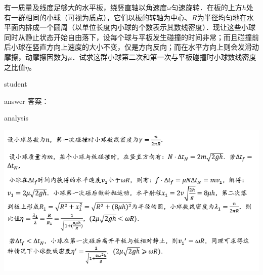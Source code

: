  
 \begin{example}
 	有一质量及线度足够大的水平板，绕竖直轴以角速度$ \omega $匀速旋转．在板的上方$ h $处有一群相同的小球（可视为质点），它们以板的转轴为中心、$ R $为半径均匀地在水平面内排成一个圆周（以单位长度内小球的个数表示其数线密度）．现让这些小球同时从静止状态开始自由落下，设每个球与平板发生碰撞的时间非常；而且碰撞前后小球在竖直方向上速度的大小不变，仅是方向反向；而在水平方向上则会发滑动摩擦，动摩擦因数为$ \mu $．试求这群小球第二次和第一次与平板碰撞时小球数线密度之比值$ \eta $。
 	
 	\begin{taggedblock}{student}
 		\vspace*{2cm}
 	\end{taggedblock}
 	
 	
 	\begin{taggedblock}{answer}
 		答案：
 	\end{taggedblock}
 	
 	
 	\begin{taggedblock}{analysis}
 		 		\begin{center}
 		 			\includegraphics[width=0.8\linewidth]{image/momentum-3}
 		 		\end{center}
 	\end{taggedblock}
 \end{example}
 
